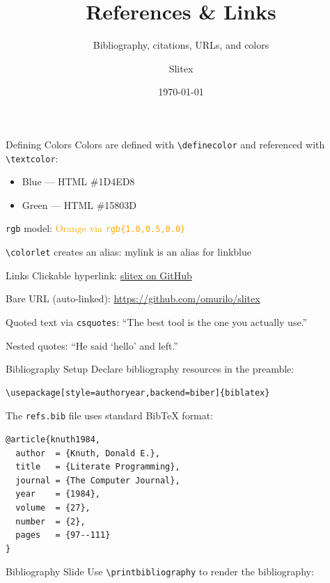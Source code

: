 \documentclass[aspectratio=169]{beamer}
\title{References \& Links}
\subtitle{Bibliography, citations, URLs, and colors}
\author{Slitex}
\date{\today}
\begin{document}
\begin{frame}
  \titlepage
\end{frame}


\begin{frame}{Defining Colors}
  Colors are defined with \texttt{\textbackslash definecolor} and referenced with \texttt{\textbackslash textcolor}:

  \begin{itemize}
    \item \textcolor{linkblue}{Blue — HTML \#1D4ED8}
    \item \textcolor{citegreen}{Green — HTML \#15803D}
  \end{itemize}

  \bigskip

  \texttt{rgb} model:
  \textcolor{orange}{Orange via \texttt{rgb\{1.0,0.5,0.0\}}}

  \bigskip

  \texttt{\textbackslash colorlet} creates an alias:
  \textcolor{mylink}{mylink is an alias for linkblue}
\end{frame}


\begin{frame}{Links}
  Clickable hyperlink:
  \href{https://github.com/omurilo/slitex}{slitex on GitHub}

  \bigskip

  Bare URL (auto-linked):
  \url{https://github.com/omurilo/slitex}

  \bigskip

  Quoted text via \texttt{csquotes}:
  \enquote{The best tool is the one you actually use.}

  \bigskip

  Nested quotes:
  \enquote{He said \enquote{hello} and left.}
\end{frame}


\begin{frame}{Bibliography Setup}
  Declare bibliography resources in the preamble:

  \begin{verbatim}
\usepackage[style=authoryear,backend=biber]{biblatex}

  \end{verbatim}

  \bigskip

  The \texttt{refs.bib} file uses standard BibTeX format:

  \begin{verbatim}
@article{knuth1984,
  author  = {Knuth, Donald E.},
  title   = {Literate Programming},
  journal = {The Computer Journal},
  year    = {1984},
  volume  = {27},
  number  = {2},
  pages   = {97--111}
}
  \end{verbatim}
\end{frame}


\begin{frame}{Bibliography Slide}
  Use \texttt{\textbackslash printbibliography} to render the bibliography:

  \printbibliography
\end{frame}
\end{document}
